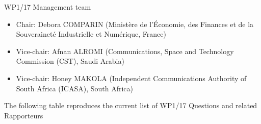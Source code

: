 WP1/17 Management team

\begin{itemize}
  \item Chair: Debora COMPARIN (Ministère de l'Économie, des Finances et de la Souveraineté Industrielle et Numérique, France)
  \item Vice-chair: Afnan ALROMI (Communications, Space and Technology Commission (CST), Saudi Arabia)
  \item Vice-chair: Honey MAKOLA (Independent Communications Authority of South Africa (ICASA), South Africa)
\end{itemize}

The following table reproduces the current list of WP1/17 Questions and related Rapporteurs

